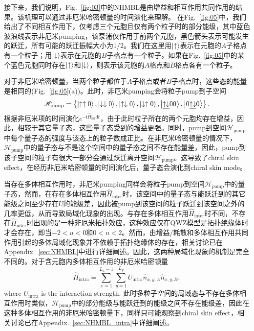 \documentclass[longbibliography, aps, prx, amsmath, amssymb, amsfonts, twocolumn,superscriptaddress, footinbib]{revtex4-1}
\begin{document}
	接下来，我们说明，Fig.~\ref{fig:03}中的NHMBL是由增益和相互作用共同作用的结果。该机理可以通过非厄米哈密顿量的时间演化来理解。%
	在Fig.~\ref{fig:05}中，我们给出了不同相互作用下，仅考虑三个元胞且仅有两个粒子时的部分能级，其中蓝色波浪线表示非厄米pumping，该泵浦仅作用于前两个元胞，黑色箭头表示可能发生的跃迁，所有可能的跃迁振幅大小为$1/2$。我们在这里用$\ket{\uparrow}$表示在元胞的$A$子格点有一个粒子；用$\ket{\downarrow}$表示在元胞的$B$子格点有一个粒子。如果在Fig.~\ref{fig:05}中的某个蓝色元胞同时存在$\ket{\uparrow}$和$\ket{\downarrow}$，则表示该元胞的$A$格点和$B$格点各有一个粒子。

	对于非厄米哈密顿量，当两个粒子都位于$A$子格点或者$B$子格点时，这些态的能量是相同的(Fig.~\ref{fig:05}(a))。此时，非厄米pumping会将粒子pump到子空间
	\begin{equation}
		\mathscr{H}_{\text{pump}}=\left\{ \ket{\uparrow\uparrow0}, \ket{\downarrow\downarrow0},\ket{\uparrow\downarrow0},\ket{\downarrow\uparrow0},\ket{\underline{\uparrow\downarrow}00},\ket{0\underline{\uparrow\downarrow}0}\right\}.
	\end{equation}
	根据非厄米项的时间演化$e^{-\mathrm{i}\hat{H}_{\text{im}} \mathrm{d}t}$，由于此时粒子所在的两个元胞均存在增益，因此，相较于其它量子态，这些量子态受到的增益更强。同时，pump到空间$\mathscr{H}_{\text{pump}}$中每个量子态的强度与该态上的粒子数成正比。在非厄米哈密顿量的情况下，$\mathscr{H}_{\text{pump}}$中的量子态与不是这个空间中的量子态之间不存在能量差，因此，pump到该子空间的粒子有很大一部分会通过跃迁离开空间$\mathscr{H}_{\text{pump}}$。这导致了chiral skin effect，在经历非厄米哈密顿量的时间演化后，量子态会演化到chiral skin mode。

	当存在多体相互作用时，非厄米pumping同样会将粒子pump到空间$\mathscr{H}_{\text{pump}}$中的量子态，然而，在存在多体相互作用$\hat{H}_{\text{inter}}$时，该空间中的量子态与能跃迁到的其它能级之间至少存在$U$的能级差，因此被pump到该空间的粒子跃迁到该空间之外的几率更低，从而导致局域化现象的出现。与存在多体相互作用$\hat{H}_{\text{inter}}$时不同，不存在$\hat{H}_{\text{inter}}$时出现的是一种非厄米拓扑效应，这种效应仅在QWZ模型是拓扑绝缘体时才会存在，即当$-2<u<0$和$0<u<2$。然而，由增益/耗散和多体相互作用共同作用引起的多体局域化现象并不依赖于拓扑绝缘体的存在，相关讨论已在Appendix.~\ref{sec:NHMBL}中进行详细阐述。因此，这两种局域化现象的机制是完全不同的。对于含元胞内多体相互作用的非厄米哈密顿量
	\begin{equation}
		\hat{H}_{\text{intra}} = \sum_{{x}=1}^{L_{x}-1} \sum_{{y}=1}^{L_{y}}  U_{\text{intra}} \hat{n}_{{x}, {y}, A} \hat{n}_{{x}, {y}, B},
	\end{equation}
	where $U_{\text{intra}}$ is the interaction strength. 
	此时多粒子空间的局域态与不存在多体相互作用时类似，$\mathscr{H}_{\text{pump}}$中的部分能级与能跃迁到的能级之间不存在能级差，因此在这种多体相互作用的非厄米哈密顿量下，同样只可能观察到chiral skin effect，相关讨论已在Appendix.~\ref{sec:NHMBL_intra}中详细阐述。
	
\end{document}
